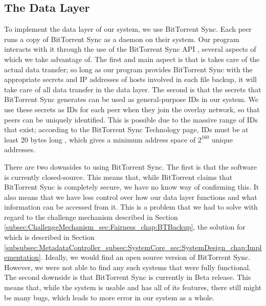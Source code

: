 \documentclass[12pt]{report}
\begin{document}
\subsection{The Data Layer}
To implement the data layer of our system, we use BitTorrent Sync. Each peer runs a copy of BitTorrent Sync as a daemon on their system. Our program interacts with it through the use of the BitTorrent Sync API \cite{btsyncapi}, several aspects of which we take advantage of. The first and main aspect is that is takes care of the actual data transfer; so long as our program provides BitTorrent Sync with the appropriate secrets and IP addresses of hosts involved in each file backup, it will take care of all data transfer in the data layer. The second is that the secrets that BitTorrent Sync generates can be used as general-purpose IDs in our system. We use these secrets as IDs for each peer when they join the overlay network, so that peers can be uniquely identified. This is possible due to the massive range of IDs that exist; according to the BitTorrent Sync Technology page, IDs must be at least 20 bytes long \cite{btsynctech}, which gives a minimum address space of $2^{160}$ unique addresses.

There are two downsides to using BitTorrent Sync. The first is that the software is currently closed-source. This means that, while BitTorrent claims that BitTorrent Sync is completely secure, we have no know way of confirming this. It also means that we have less control over how our data layer functions and what information can be accessed from it. This is a problem that we had to solve with regard to the challenge mechanism described in Section \ref{subsec:ChallengeMechanism_sec:Fairness_chap:BTBackup}, the solution for which is described in Section \ref{subsubsec:MetadataController_subsec:SystemCore_sec:SystemDesign_chap:Implementation}. Ideally, we would find an open source version of BitTorrent Sync. However, we were not able to find any such systems that were fully functional. The second downside is that BitTorrent Sync is currently in Beta release. This means that, while the system is usable and has all of its features, there still might be many bugs, which leads to more error in our system as a whole.
\end{document}
